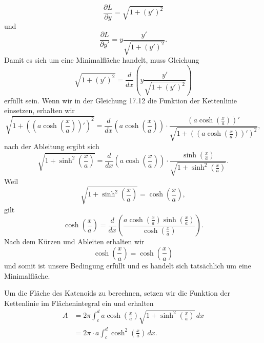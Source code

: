\begin{equation}
	\frac{\partial L}{\partial y} = \sqrt{1 + (y')^2}
\end{equation}
und 
\begin{equation}
	\frac{\partial L}{\partial y'} = y \frac{y'}{\sqrt{1 + (y')^2}}.
\end{equation}
Damit es sich um eine Minimalfläche handelt, muss Gleichung
\begin{equation}
	\sqrt{1 + (y')^2} = \frac{d}{dx} \left( y \frac{y'}{\sqrt{1 + (y')^2}} \right)
\end{equation}
erfüllt sein.
Wenn wir in der Gleichung 17.12 die Funktion der Kettenlinie einsetzen, erhalten wir 
\begin{equation}
	\sqrt{1 + \left( \left( a \cosh \left( \frac{x}{a} \right) \right)' \right)^2 } = \frac{d}{dx} \left( a \cosh \left( \frac{x}{a} \right) \right) \cdot \frac{\left( a \cosh \left( \frac{x}{a} \right) \right)'}{\sqrt{1 + \left( \left( a \cosh \left( \frac{x}{a} \right) \right)' \right)^2 }},
\end{equation}
nach der Ableitung ergibt sich 
\begin{equation}
	\sqrt{1 + \sinh^2 \left( \frac{x}{a} \right)} = \frac{d}{dx}  \left( a \cosh \left( \frac{x}{a} \right) \right) \cdot \frac{\sinh \left( \frac{x}{a} \right)}{\sqrt{1 + \sinh^2 \left( \frac{x}{a} \right)}}.
\end{equation}
Weil
\begin{equation}
	\sqrt{1 + \sinh^2 \left( \frac{x}{a} \right)} = \cosh \left( \frac{x}{a} \right),
\end{equation}
gilt 
\begin{equation}
	\cosh \left( \frac{x}{a} \right) = \frac{d}{dx} \left( \frac{a \cosh \left( \frac{x}{a} \right) \sinh \left( \frac{x}{a} \right)}{\cosh \left( \frac{x}{a} \right)} \right).
\end{equation}	
Nach dem Kürzen und Ableiten erhalten wir 
\begin{equation}
	\cosh \left( \frac{x}{a} \right) = \cosh \left( \frac{x}{a} \right)
\end{equation}	
%
und somit ist unsere Bedingung erfüllt und es handelt sich tatsächlich um eine Minimalfläche. 

Um die Fläche des Katenoids zu berechnen, setzen wir die Funktion der Kettenlinie im Flächenintegral ein und erhalten 
\begin{align}
	A &= 2\pi \int_{c}^{d} a \cosh \left( \frac{x}{a} \right) \sqrt{1 + \sinh^2 \left( \frac{x}{a} \right)} \,dx \\
	&= 2\pi \cdot a \int_{c}^{d} \cosh^2 \left( \frac{x}{a} \right) \,dx.
\end{align}
